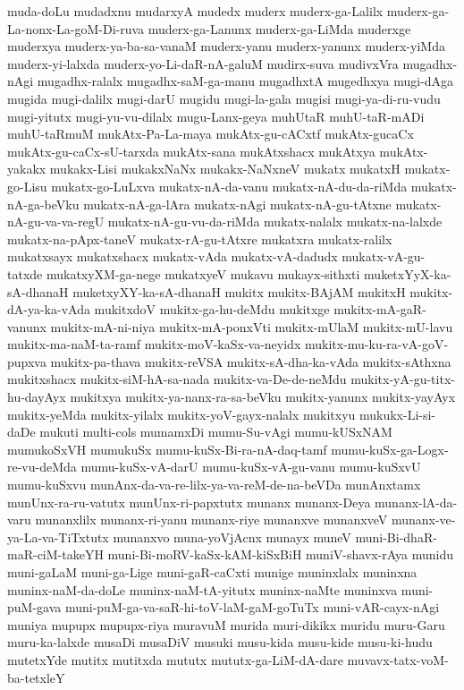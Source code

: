 {muda-doLu
mudadxnu
mudarxyA
mudedx
muderx
muderx-ga-Lalilx
muderx-ga-La-nonx-La-goM-Di-ruva
muderx-ga-Lanunx
muderx-ga-LiMda
muderxge
muderxya
muderx-ya-ba-sa-vanaM
muderx-yanu
muderx-yanunx
muderx-yiMda
muderx-yi-lalxda
muderx-yo-Li-daR-nA-galuM
mudirx-suva
mudivxVra
mugadhx-nAgi
mugadhx-ralalx
mugadhx-saM-ga-manu
mugadhxtA
mugedhxya
mugi-dAga
mugida
mugi-dalilx
mugi-darU
mugidu
mugi-la-gala
mugisi
mugi-ya-di-ru-vudu
mugi-yitutx
mugi-yu-vu-dilalx
mugu-Lanx-geya
muhUtaR
muhU-taR-mADi
muhU-taRmuM
mukAtx-Pa-La-maya
mukAtx-gu-cACxtf
mukAtx-gucaCx
mukAtx-gu-caCx-sU-tarxda
mukAtx-sana
mukAtxshacx
mukAtxya
mukAtx-yakakx
mukakx-Lisi
mukakxNaNx
mukakx-NaNxneV
mukatx
mukatxH
mukatx-go-Lisu
mukatx-go-LuLxva
mukatx-nA-da-vanu
mukatx-nA-du-da-riMda
mukatx-nA-ga-beVku
mukatx-nA-ga-lAra
mukatx-nAgi
mukatx-nA-gu-tAtxne
mukatx-nA-gu-va-va-regU
mukatx-nA-gu-vu-da-riMda
mukatx-nalalx
mukatx-na-lalxde
mukatx-na-pApx-taneV
mukatx-rA-gu-tAtxre
mukatxra
mukatx-ralilx
mukatxsayx
mukatxshacx
mukatx-vAda
mukatx-vA-dadudx
mukatx-vA-gu-tatxde
mukatxyXM-ga-nege
mukatxyeV
mukavu
mukayx-sithxti
muketxYyX-ka-sA-dhanaH
muketxyXY-ka-sA-dhanaH
mukitx
mukitx-BAjAM
mukitxH
mukitx-dA-ya-ka-vAda
mukitxdoV
mukitx-ga-hu-deMdu
mukitxge
mukitx-mA-gaR-vanunx
mukitx-mA-ni-niya
mukitx-mA-ponxVti
mukitx-mUlaM
mukitx-mU-lavu
mukitx-ma-naM-ta-ramf
mukitx-moV-kaSx-va-neyidx
mukitx-mu-ku-ra-vA-goV-pupxva
mukitx-pa-thava
mukitx-reVSA
mukitx-sA-dha-ka-vAda
mukitx-sAthxna
mukitxshacx
mukitx-siM-hA-sa-nada
mukitx-va-De-de-neMdu
mukitx-yA-gu-titx-hu-dayAyx
mukitxya
mukitx-ya-nanx-ra-sa-beVku
mukitx-yanunx
mukitx-yayAyx
mukitx-yeMda
mukitx-yilalx
mukitx-yoV-gayx-nalalx
mukitxyu
mukukx-Li-si-daDe
mukuti
multi-cols
mumamxDi
mumu-Su-vAgi
mumu-kUSxNAM
mumukoSxVH
mumukuSx
mumu-kuSx-Bi-ra-nA-daq-tamf
mumu-kuSx-ga-Logx-re-vu-deMda
mumu-kuSx-vA-darU
mumu-kuSx-vA-gu-vanu
mumu-kuSxvU
mumu-kuSxvu
munAnx-da-va-re-lilx-ya-va-reM-de-na-beVDa
munAnxtamx
munUnx-ra-ru-vatutx
munUnx-ri-papxtutx
munanx
munanx-Deya
munanx-lA-da-varu
munanxlilx
munanx-ri-yanu
munanx-riye
munanxve
munanxveV
munanx-ve-ya-La-va-TiTxtutx
munanxvo
muna-yoVjAcnx
munayx
muneV
muni-Bi-dhaR-maR-ciM-takeYH
muni-Bi-moRV-kaSx-kAM-kiSxBiH
muniV-shavx-rAya
munidu
muni-gaLaM
muni-ga-Lige
muni-gaR-caCxti
munige
muninxlalx
muninxna
muninx-naM-da-doLe
muninx-naM-tA-yitutx
muninx-naMte
muninxva
muni-puM-gava
muni-puM-ga-va-saR-hi-toV-laM-gaM-goTuTx
muni-vAR-cayx-nAgi
muniya
mupupx
mupupx-riya
muravuM
murida
muri-dikikx
muridu
muru-Garu
muru-ka-lalxde
musaDi
musaDiV
musuki
musu-kida
musu-kide
musu-ki-hudu
mutetxYde
mutitx
mutitxda
mututx
mututx-ga-LiM-dA-dare
muvavx-tatx-voM-ba-tetxleY
}
